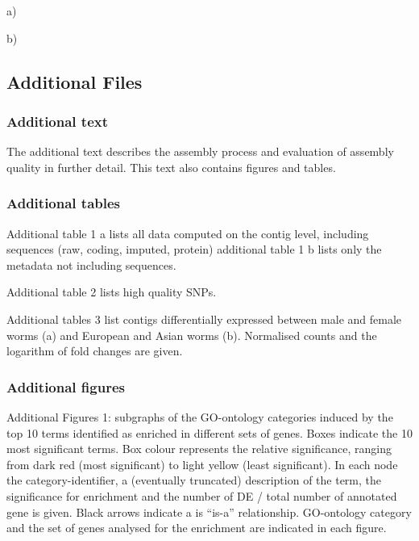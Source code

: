 \documentclass[10pt]{bmc_article}
\newenvironment{bmcformat}{\begin{raggedright}\baselineskip20pt\sloppy\setboolean{publ}{false}}{\end{raggedright}\baselineskip20pt\sloppy}
\begin{document}
\begin{bmcformat}
a)\\


\newpage

b)\\


\normalsize


\subsection*{Additional Files}

\subsubsection*{Additional text}
The additional text describes the assembly process and evaluation of
assembly quality in further detail. This text also contains figures
and tables.

\subsubsection*{Additional tables}

Additional table 1 a lists all data computed on the contig level,
including sequences (raw, coding, imputed, protein) additional table 1
b lists only the metadata not including sequences.

Additional table 2 lists high quality SNPs.

Additional tables 3 list contigs differentially expressed between male
and female worms (a) and European and Asian worms (b). Normalised
counts and the logarithm of fold changes are given.

\subsubsection*{Additional figures}
Additional Figures 1: subgraphs of the GO-ontology categories induced
by the top 10 terms identified as enriched in different sets of
genes. Boxes indicate the 10 most significant terms. Box colour
represents the relative significance, ranging from dark red (most
significant) to light yellow (least significant). In each node the
category-identifier, a (eventually truncated) description of the term,
the significance for enrichment and the number of DE / total number of
annotated gene is given. Black arrows indicate a is ``is-a''
relationship. GO-ontology category and the set of genes analysed for
the enrichment are indicated in each figure.

\end{bmcformat}
\end{document}
